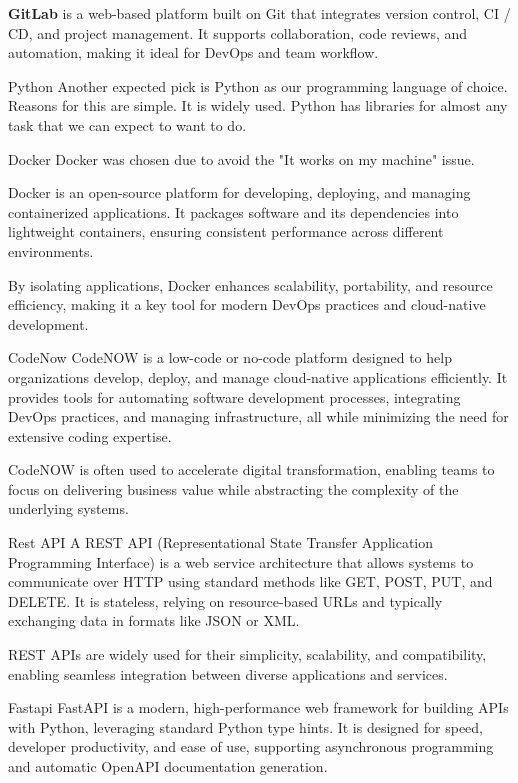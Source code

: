 {\bf GitLab} is a web-based platform built on Git that integrates version control, CI / CD, and project management. It supports collaboration, code reviews, and automation, making it ideal for DevOps and team workflow.

\secc Python
Another expected pick is Python as our programming language of choice. Reasons for this are simple. It is widely used. Python has libraries for almost any task that we can expect to want to do.

\secc Docker
Docker was chosen due to avoid the "It works on my machine" issue.

Docker is an open-source platform for developing, deploying, and managing containerized applications. It packages software and its dependencies into lightweight containers, ensuring consistent performance across different environments.

By isolating applications, Docker enhances scalability, portability, and resource efficiency, making it a key tool for modern DevOps practices and cloud-native development.

\secc CodeNow
CodeNOW is a low-code or no-code platform designed to help organizations develop, deploy, and manage cloud-native applications efficiently. It provides tools for automating software development processes, integrating DevOps practices, and managing infrastructure, all while minimizing the need for extensive coding expertise.

CodeNOW is often used to accelerate digital transformation, enabling teams to focus on delivering business value while abstracting the complexity of the underlying systems.

\secc Rest API
A REST API (Representational State Transfer Application Programming Interface) is a web service architecture that allows systems to communicate over HTTP using standard methods like GET, POST, PUT, and DELETE. It is stateless, relying on resource-based URLs and typically exchanging data in formats like JSON or XML.

REST APIs are widely used for their simplicity, scalability, and compatibility, enabling seamless integration between diverse applications and services.

\secc Fastapi
FastAPI is a modern, high-performance web framework for building APIs with Python, leveraging standard Python type hints. It is designed for speed, developer productivity, and ease of use, supporting asynchronous programming and automatic OpenAPI documentation generation.

